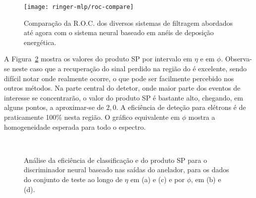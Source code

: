 \begin{figure}
\begin{center}
\texttt{[image: ringer-mlp/roc-compare]}
\end{center}
\caption{Comparação da R.O.C. dos diversos sistemas de filtragem abordados até
agora com o sistema neural baseado em anéis de deposição energética.} 
\label{fig:ringer-test-roc}
\end{figure}

A Figura~\ref{fig:ringer-eta-phi} mostra os valores do produto SP por
intervalo em $\eta$ e em $\phi$. Observa-se neste caso que a recuperação do
sinal perdido na região do  é excelente, sendo difícil notar onde
realmente ocorre, o que pode ser facilmente percebido nos outros métodos. Na
parte central do detetor, onde maior parte dos eventos de interesse se
concentrarão, o valor do produto SP é bastante alto, chegando, em alguns
pontos, a aproximar-se de $2,0$. A eficiência de deteção para elétrons é de
praticamente 100\% nesta região. O gráfico equivalente em $\phi$ mostra a
homogeneidade esperada para todo o espectro.

\begin{figure}
\begin{center}
\mbox{%
}
\mbox{%
}
\end{center}
\caption{Análise da eficiência de classificação e do produto SP para o
discriminador neural baseado nas saídas do anelador, para os dados do conjunto
de teste ao longo de $\eta$ em (a) e (c) e por $\phi$, em (b) e (d).}
\label{fig:ringer-eta-phi}
\end{figure}




